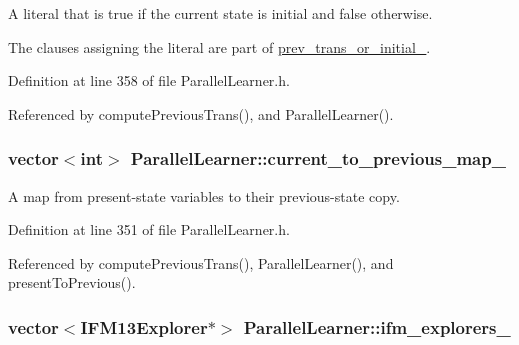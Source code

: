 A literal that is true if the current state is initial and false otherwise. 

The clauses assigning the literal are part of \hyperlink{classParallelLearner_ac73d9338262855f61f23a65d1df0647c}{prev\-\_\-trans\-\_\-or\-\_\-initial\-\_\-}. 

Definition at line 358 of file Parallel\-Learner.\-h.



Referenced by compute\-Previous\-Trans(), and Parallel\-Learner().

\hypertarget{classParallelLearner_a6f8dfda6aa8640345057023ed85882b9}{
\subsubsection[{current\-\_\-to\-\_\-previous\-\_\-map\-\_\-}]{\setlength{\rightskip}{0pt plus 5cm}vector$<$int$>$ Parallel\-Learner\-::current\-\_\-to\-\_\-previous\-\_\-map\-\_\-\hspace{0.3cm}{\ttfamily [protected]}}}\label{classParallelLearner_a6f8dfda6aa8640345057023ed85882b9}


A map from present-\/state variables to their previous-\/state copy. 



Definition at line 351 of file Parallel\-Learner.\-h.



Referenced by compute\-Previous\-Trans(), Parallel\-Learner(), and present\-To\-Previous().

\hypertarget{classParallelLearner_a614707a21f36d75a9fd06be57ee421d0}{
\subsubsection[{ifm\-\_\-explorers\-\_\-}]{\setlength{\rightskip}{0pt plus 5cm}vector$<${\bf I\-F\-M13\-Explorer}$\ast$$>$ Parallel\-Learner\-::ifm\-\_\-explorers\-\_\-\hspace{0.3cm}{\ttfamily [protected]}}}\label{classParallelLearner_a614707a21f36d75a9fd06be57ee421d0}


